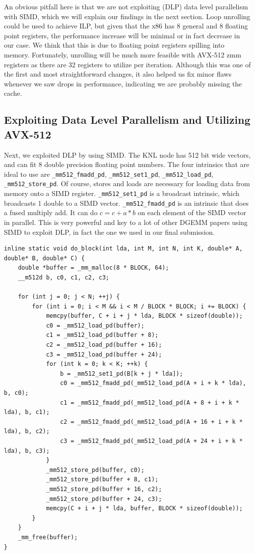 \documentclass{article}
\begin{document}
An obvious pitfall here is that we are not exploiting (DLP) data level parallelism with SIMD, which we will explain our findings in the next section. Loop unrolling could be used to achieve ILP, but given that the x86 has 8 general and 8 floating point registers, the performance increase will be minimal or in fact decrease in our case. We think that this is due to floating point registers spilling into memory. Fortunately, unrolling will be much more feasible with AVX-512 zmm registers as there are 32 registers to utilize per iteration. Although this was one of the first and most straightforward changes, it also helped us fix minor flaws whenever we saw drops in performance, indicating we are probably missing the cache.

\subsection{Exploiting Data Level Parallelism and Utilizing AVX-512}
Next, we exploited DLP by using SIMD. The KNL node has 512 bit wide vectors, and can fit 8 double precision floating point numbers. The four intrinsics that are ideal to use are \verb|_mm512_fmadd_pd|, \verb|_mm512_set1_pd|, \verb|_mm512_load_pd|, \verb|_mm512_store_pd|. Of course, stores and loads are necessary for loading data from memory onto a SIMD register. \verb|_mm512_set1_pd| is a broadcast intrinsic, which broadcasts 1 double to a SIMD vector. \verb|_mm512_fmadd_pd| is an intrinsic that does a fused multiply add. It can do $c = c + a * b$ on each element of the SIMD vector in parallel. This is very powerful and key to a lot of other DGEMM papers using SIMD to exploit DLP, in fact the one we used in our final submission.

\begin{verbatim}
inline static void do_block(int lda, int M, int N, int K, double* A, double* B, double* C) {
    double *buffer = _mm_malloc(8 * BLOCK, 64);
    __m512d b, c0, c1, c2, c3;

    for (int j = 0; j < N; ++j) {
        for (int i = 0; i < M && i < M / BLOCK * BLOCK; i += BLOCK) {
            memcpy(buffer, C + i + j * lda, BLOCK * sizeof(double));
            c0 = _mm512_load_pd(buffer);
            c1 = _mm512_load_pd(buffer + 8);
            c2 = _mm512_load_pd(buffer + 16);
            c3 = _mm512_load_pd(buffer + 24);
            for (int k = 0; k < K; ++k) {
                b = _mm512_set1_pd(B[k + j * lda]);
                c0 = _mm512_fmadd_pd(_mm512_load_pd(A + i + k * lda), b, c0);
                c1 = _mm512_fmadd_pd(_mm512_load_pd(A + 8 + i + k * lda), b, c1);
                c2 = _mm512_fmadd_pd(_mm512_load_pd(A + 16 + i + k * lda), b, c2);
                c3 = _mm512_fmadd_pd(_mm512_load_pd(A + 24 + i + k * lda), b, c3);
            }
            _mm512_store_pd(buffer, c0);
            _mm512_store_pd(buffer + 8, c1);
            _mm512_store_pd(buffer + 16, c2);
            _mm512_store_pd(buffer + 24, c3);
            memcpy(C + i + j * lda, buffer, BLOCK * sizeof(double));
        }
    }
    _mm_free(buffer);
}
\end{verbatim}
\end{document}
